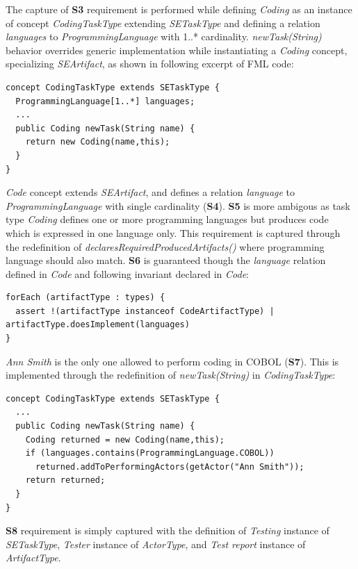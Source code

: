 The capture of \textbf{S3} requirement is performed while defining \textit{Coding} as an instance of concept \textit{CodingTaskType} extending \textit{SETaskType} and defining a relation \textit{languages} to \textit{ProgrammingLanguage} with 1..* cardinality. \textit{newTask(String)} behavior overrides generic implementation while instantiating a \textit{Coding} concept, specializing \textit{SEArtifact}, as shown in following excerpt of FML code:

\begin{lstlisting}
concept CodingTaskType extends SETaskType {
  ProgrammingLanguage[1..*] languages;
  ...
  public Coding newTask(String name) { 
    return new Coding(name,this); 
  }
}    
\end{lstlisting}

\textit{Code} concept extends \textit{SEArtifact}, and defines a relation \textit{language} to \textit{ProgrammingLanguage} with single cardinality (\textbf{S4}). \textbf{S5} is more ambigous as task type \textit{Coding} defines one or more programming languages but produces code which is expressed in one language only. This requirement is captured through the redefinition of \textit{declaresRequiredProducedArtifacts()} where programming language should also match. 
\textbf{S6} is guaranteed though the \textit{language} relation defined in \textit{Code} and following invariant declared in \textit{Code}:  

\begin{lstlisting}
forEach (artifactType : types) {
  assert !(artifactType instanceof CodeArtifactType) | artifactType.doesImplement(languages)
}
\end{lstlisting}

\textit{Ann Smith} is the only one allowed to perform coding in COBOL (\textbf{S7}). This is implemented through the redefinition of \textit{newTask(String)} in \textit{CodingTaskType}:

\begin{lstlisting}
concept CodingTaskType extends SETaskType {
  ...
  public Coding newTask(String name) {
    Coding returned = new Coding(name,this); 
    if (languages.contains(ProgrammingLanguage.COBOL))
      returned.addToPerformingActors(getActor("Ann Smith"));
    return returned;
  }
}    
\end{lstlisting}

\textbf{S8} requirement is simply captured with the definition of \textit{Testing} instance of \textit{SETaskType}, \textit{Tester} instance of \textit{ActorType}, and \textit{Test report} instance of \textit{ArtifactType}.

